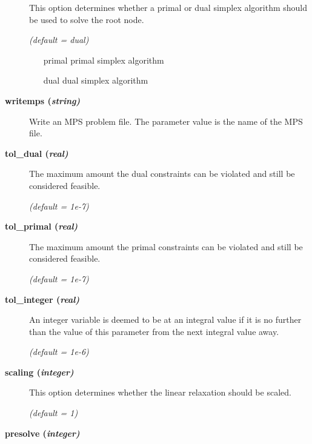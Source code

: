 \begin{description}
This option determines whether a primal or dual simplex algorithm should be used to solve the root node.

\textsl{(default = dual)}
\begin{itemize}
\item[primal] primal simplex algorithm
\item[dual] dual simplex algorithm
\end{itemize}

\item[\label{writemps}\hypertarget{writemps}
{\textbf{writemps (\slshape{string})}}]\hspace{1.0in}

Write an MPS problem file.
The parameter value is the name of the MPS file.

\item[\label{tol_dual}\hypertarget{tol_dual}
{\textbf{tol\_dual (\slshape{real})}}]\hspace{1.0in}

The maximum amount the dual constraints can be violated and still be considered feasible.

\textsl{(default = 1e-7)}

\item[\label{tol_primal}\hypertarget{tol_primal}
{\textbf{tol\_primal (\slshape{real})}}]\hspace{1.0in}

The maximum amount the primal constraints can be violated and still be considered feasible.

\textsl{(default = 1e-7)}

\item[\label{tol_integer}\hypertarget{tol_integer}
{\textbf{tol\_integer (\slshape{real})}}]\hspace{1.0in}

An integer variable is deemed to be at an integral value if it is no further than the value of this parameter from the next integral value away.

\textsl{(default = 1e-6)}


\item[\label{scaling}\hypertarget{scaling}
{\textbf{scaling (\slshape{integer})}}]\hspace{1.0in}

This option determines whether the linear relaxation should be scaled.

\textsl{(default = 1)}

\item[\label{presolve}\hypertarget{presolve}
{\textbf{presolve (\slshape{integer})}}]\hspace{1.0in}


\end{description}
